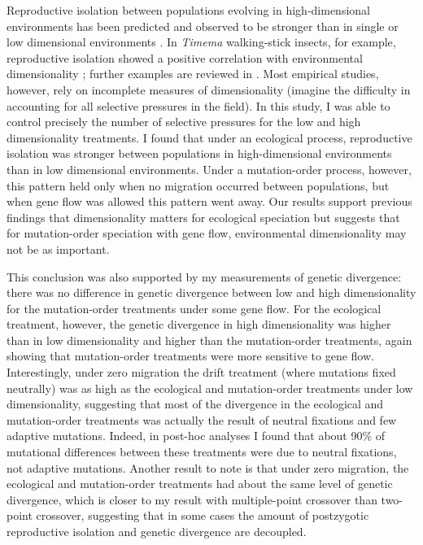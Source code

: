 \begin{doublespace}
Reproductive isolation between populations evolving in high-dimensional
environments has been predicted and observed to be stronger than in single or
low dimensional environments \citep{ric93,nos09,nos09b}.
%
In \emph{Timema} walking-stick insects, for example, reproductive isolation
showed a positive correlation with environmental dimensionality
\citep{nos08b,nos09b}; further examples are reviewed in \citet{nos09}.
%
Most empirical studies, however, rely on incomplete measures of dimensionality
(imagine the difficulty in accounting for all selective pressures in the field).
%
In this study, I was able to control precisely the number of selective
pressures for the low and high dimensionality treatments.
%
I found that under an ecological process, reproductive isolation was stronger
between populations in high-dimensional environments than in low dimensional
environments.
%
Under a mutation-order process, however, this pattern held only when no
migration occurred between populations, but when gene flow was allowed this
pattern went away.
%
Our results support previous findings that dimensionality matters for
ecological speciation but suggests that for mutation-order speciation with gene
flow, environmental dimensionality may not be as important.



This conclusion was also supported by my measurements of genetic divergence:
there was no difference in genetic divergence between low and high
dimensionality for the mutation-order treatments under some gene flow.
%
For the ecological treatment, however, the genetic divergence in high
dimensionality was higher than in low dimensionality and higher than the
mutation-order treatments, again showing that mutation-order treatments were
more sensitive to gene flow.
%
Interestingly, under zero migration the drift treatment (where mutations fixed
neutrally) was as high as the ecological and mutation-order treatments under
low dimensionality, suggesting that most of the divergence in the ecological
and mutation-order treatments was actually the result of neutral fixations and
few adaptive mutations.
%
Indeed, in post-hoc analyses I found that about 90\% of mutational differences
between these treatments were due to neutral fixations, not adaptive mutations.
%
Another result to note is that under zero migration, the ecological and
mutation-order treatments had about the same level of genetic divergence, which
is closer to my result with multiple-point crossover than two-point crossover,
suggesting that in some cases the amount of postzygotic reproductive isolation
and genetic divergence are decoupled.




\end{doublespace}
